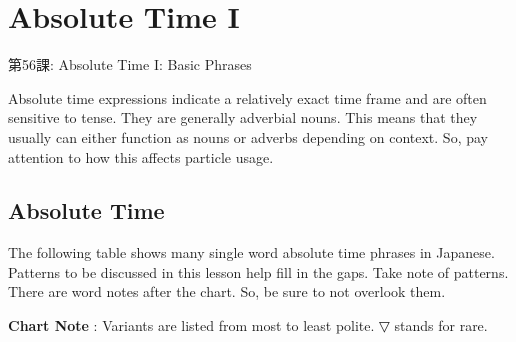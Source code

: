     
\chapter{Absolute Time I}

\begin{center}
\begin{Large}
第56課: Absolute Time I: Basic Phrases 
\end{Large}
\end{center}
 
\par{ Absolute time expressions indicate a relatively exact time frame and are often sensitive to tense. They are generally adverbial nouns. This means that they usually can either function as nouns or adverbs depending on context. So, pay attention to how this affects particle usage. }
      
\section{Absolute Time}
 
\par{ The following table shows many single word absolute time phrases in Japanese. Patterns to be discussed in this lesson help fill in the gaps. Take note of patterns. There are word notes after the chart. So, be sure to not overlook them. }

\par{\textbf{Chart Note }: Variants are listed from most to least polite. ▽ stands for rare. }

